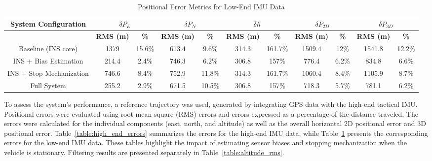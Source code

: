 \documentclass[conference]{IEEEtran}
\begin{document}
\begin{table}[htbp]
\caption{Positional Error Metrics for Low-End IMU Data}
\begin{center}
\begin{tabular}{|c|cc|cc|cc|cc|cc|}
\hline
\textbf{System Configuration} & \multicolumn{2}{c|}{$\delta P_E$} & \multicolumn{2}{c|}{$\delta P_N$} & \multicolumn{2}{c|}{$\delta h$} & \multicolumn{2}{c|}{$\delta P_{2D}$} & \multicolumn{2}{c|}{$\delta P_{3D}$} \\ \hline
                              & \textbf{RMS (m)} & \textbf{\%} & \textbf{RMS (m)} & \textbf{\%} & \textbf{RMS (m)} & \textbf{\%} & \textbf{RMS (m)} & \textbf{\%} & \textbf{RMS (m)} & \textbf{\%} \\ \hline
Baseline (INS core)           & 1379           & 15.6\%      & 613.4           & 9.6\%       & 314.3           & 161.7\%     & 1509.4           & 12\%        & 1541.8           & 12.2\%      \\ \hline
INS + Bias Estimation         & 214.4           & 2.4\%       & 746.3           & 6.2\%       & 306.8           & 157\%       & 776.4           & 6.2\%       & 834.8           & 6.6\%       \\ \hline
INS + Stop Mechanization      & 746.6           & 8.4\%       & 752.9           & 11.8\%       & 314.3           & 161.7\%     & 1060.4           & 8.4\%       & 1105.9           & 8.7\%       \\ \hline
Full System                   & 255.2           & 2.9\%       & 671.5           & 10.5\%       & 306.8           & 157\%       & 718.3           & 5.7\%       & 781.1           & 6.2\%       \\ \hline
\end{tabular}
\label{table:low_end_errors}
\end{center}
\end{table}


To assess the system’s performance, a reference trajectory was used, generated by integrating GPS data with the high-end tactical IMU. Positional errors were evaluated using root mean square (RMS) errors and errors expressed as a percentage of the distance traveled. The errors were calculated for the individual components (east, north, and altitude) as well as the overall horizontal 2D positional error and 3D positional error. Table~\ref{table:high_end_errors} summarizes the errors for the high-end IMU data, while Table~\ref{table:low_end_errors}  presents the corresponding errors for the low-end IMU data. These tables highlight the impact of estimating sensor biases and stopping mechanization when the vehicle is stationary. Filtering results are presented separately in Table~\ref{table:altitude_rms}.
\end{document}
